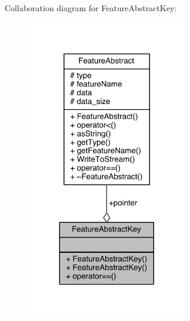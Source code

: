 Collaboration diagram for Feature\+Abstract\+Key\+:
\nopagebreak
\begin{figure}[H]
\begin{center}
\leavevmode
\includegraphics[width=200pt]{class_feature_abstract_key__coll__graph}
\end{center}
\end{figure}


